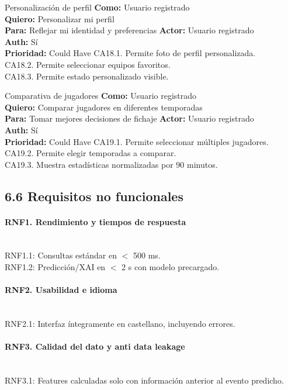 {Personalización de perfil}
{\textbf{Como:} Usuario registrado\\ \textbf{Quiero:} Personalizar mi perfil\\ \textbf{Para:} Reflejar mi identidad y preferencias}
{\textbf{Actor:} Usuario registrado\\ \textbf{Auth:} Sí\\ \textbf{Prioridad:} Could Have}
{CA18.1. Permite foto de perfil personalizada.\\ CA18.2. Permite seleccionar equipos favoritos.\\ CA18.3. Permite estado personalizado visible.}

{Comparativa de jugadores}
{\textbf{Como:} Usuario registrado\\ \textbf{Quiero:} Comparar jugadores en diferentes temporadas\\ \textbf{Para:} Tomar mejores decisiones de fichaje}
{\textbf{Actor:} Usuario registrado\\ \textbf{Auth:} Sí\\ \textbf{Prioridad:} Could Have}
{CA19.1. Permite seleccionar múltiples jugadores.\\ CA19.2. Permite elegir temporadas a comparar.\\ CA19.3. Muestra estadísticas normalizadas por 90 minutos.}

\subsection{6.6 Requisitos no funcionales}

\paragraph{RNF1. Rendimiento y tiempos de respuesta}
~\\
RNF1.1: Consultas estándar en $<$ 500 ms. \\
RNF1.2: Predicción/XAI en $<$ 2 s con modelo precargado.

\paragraph{RNF2. Usabilidad e idioma}
~\\
RNF2.1: Interfaz íntegramente en castellano, incluyendo errores.

\paragraph{RNF3. Calidad del dato y anti data leakage}
~\\
RNF3.1: Features calculadas solo con información anterior al evento predicho.

